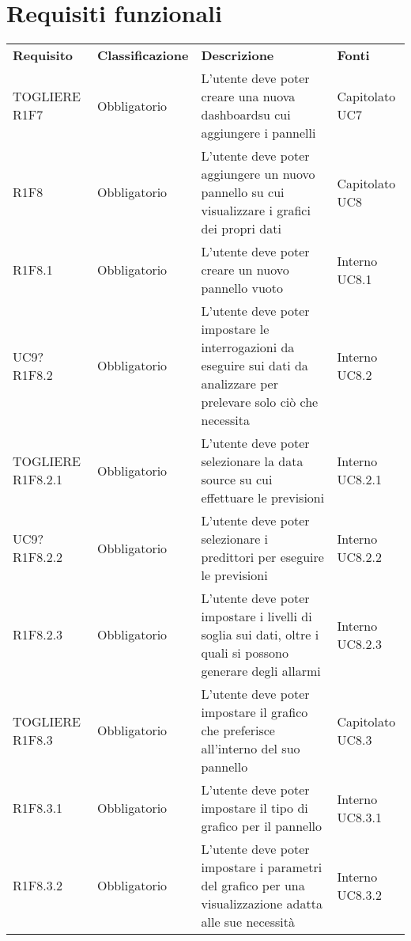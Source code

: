 \section{Requisiti funzionali}
	\begin{longtable} {
		>{}p{24mm} 
		>{}p{32mm}
		>{}p{40mm} 
		>{}p{24.5mm}
		}
	\rowcolor{gray!50}
		\textbf{Requisito} & \textbf{Classificazione} & \textbf{Descrizione} & \textbf{Fonti} 	\TBstrut \\
		
	TOGLIERE	
		R1F7 & Obbligatorio & L'utente deve poter creare una nuova dashboard\glosp su cui aggiungere i pannelli & Capitolato UC7 \TBstrut \\ [2mm]
		R1F8 & Obbligatorio & L'utente deve poter aggiungere un nuovo pannello su cui visualizzare i grafici dei propri dati & Capitolato UC8 \TBstrut \\ [2mm]
		R1F8.1 & Obbligatorio & L'utente deve poter creare un nuovo pannello vuoto & Interno UC8.1 \TBstrut \\ [2mm]
		
	UC9?
		R1F8.2 & Obbligatorio & L'utente deve poter impostare le interrogazioni da eseguire sui dati da analizzare per prelevare solo ciò che necessita & Interno UC8.2 \TBstrut \\ [2mm]
		
	TOGLIERE	
		R1F8.2.1 & Obbligatorio & L'utente deve poter selezionare la data source su cui effettuare le previsioni & Interno UC8.2.1 \TBstrut \\ [2mm]
		
	UC9?	
		R1F8.2.2 & Obbligatorio & L'utente deve poter selezionare i predittori per eseguire le previsioni & Interno UC8.2.2 \TBstrut \\ [2mm]
		R1F8.2.3 & Obbligatorio & L'utente deve poter impostare i livelli di soglia sui dati, oltre i quali si possono generare degli allarmi & Interno UC8.2.3 \TBstrut \\ [2mm]
		
	TOGLIERE	
		R1F8.3 & Obbligatorio & L'utente deve poter impostare il grafico che preferisce all'interno del suo pannello & Capitolato UC8.3 \TBstrut \\ [2mm]		
		R1F8.3.1 & Obbligatorio & L'utente deve poter impostare il tipo di grafico per il pannello & Interno UC8.3.1 \TBstrut \\ [2mm]
		R1F8.3.2 & Obbligatorio & L'utente deve poter impostare i parametri del grafico per una visualizzazione adatta alle sue necessità & Interno UC8.3.2 \TBstrut \\ [2mm]
		

\end{longtable}
